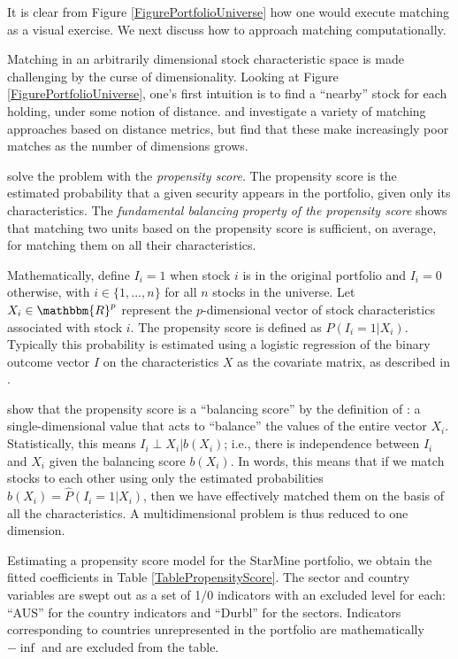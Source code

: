 \documentclass{article}\usepackage{graphicx, color}
\begin{document}
It is clear from Figure \ref{FigurePortfolioUniverse} how one would
execute matching as a visual exercise. We next discuss how to approach
matching computationally.

Matching in an arbitrarily dimensional stock characteristic space is
made challenging by the curse of dimensionality. Looking at Figure
\ref{FigurePortfolioUniverse}, one's first intuition is to find a
``nearby'' stock for each holding, under some notion of
distance. \cite{rubin73.1} and \cite{rubin73.2} investigate a variety
of matching approaches based on distance metrics, but find that these make
increasingly poor matches as the number of dimensions grows.

\cite{rosenbaum83} solve the problem with the \emph{propensity score}.
The propensity score is the estimated probability that a given
security appears in the portfolio, given only its characteristics. The
\emph{fundamental balancing property of the propensity score} shows
that matching two units based on the propensity score is sufficient,
on average, for matching them on all their characteristics.

Mathematically, define $I_i = 1$ when stock $i$ is in the original
portfolio and $I_i = 0$ otherwise, with $i \in \{1, ..., n\}$ for all
$n$ stocks in the universe. Let $X_i \in \mathbbm{R}^p$ represent the
$p$-dimensional vector of stock characteristics associated with stock
$i$. The propensity score is defined as $P(I_i = 1 | X_i)$. Typically
this probability is estimated using a logistic regression of the
binary outcome vector $I$ on the characteristics $X$ as the covariate
matrix, as described in \cite{rubin96}.

\cite{rosenbaum83} show that the propensity score is a ``balancing
score'' by the definition of \cite{dawid79}: a single-dimensional
value that acts to ``balance'' the values of the entire vector
$X_i$. Statistically, this
means $I_i \perp X_i | b(X_i)$; i.e., there is independence between
$I_i$ and $X_i$ given the balancing score $b(X_i)$. In words, this
means that if we match stocks to each other using only the estimated
probabilities $b(X_i) = \hat{P}(I_i = 1 | X_i)$, then we have
effectively matched them on the basis of all the characteristics. A
multidimensional problem is thus reduced to one dimension.

Estimating a propensity score model for the StarMine portfolio, we
obtain the fitted coefficients in Table
\ref{TablePropensityScore}. The sector and country variables are swept
out as a set of 1/0 indicators with an excluded level for each:
``AUS'' for the country indicators and ``Durbl'' for the
sectors. Indicators corresponding to countries unrepresented in the
portfolio are mathematically $-\inf$ and are excluded from the
table.
\end{document}
